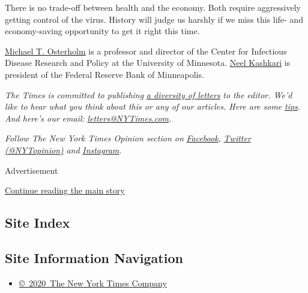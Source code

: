 There is no trade-off between health and the economy. Both require
aggressively getting control of the virus. History will judge us harshly
if we miss this life- and economy-saving opportunity to get it right
this time.

\href{https://www.cidrap.umn.edu/about-us/cidrap-staff/michael-t-osterholm-phd-mph}{Michael
T. Osterholm} is a professor and director of the Center for Infectious
Disease Research and Policy at the University of Minnesota.
\href{https://www.federalreservehistory.org/people/neel_kashkari}{Neel
Kashkari} is president of the Federal Reserve Bank of Minneapolis.

\emph{The Times is committed to publishing}
\href{https://www.nytimes3xbfgragh.onion/2019/01/31/opinion/letters/letters-to-editor-new-york-times-women.html}{\emph{a
diversity of letters}} \emph{to the editor. We'd like to hear what you
think about this or any of our articles. Here are some}
\href{https://help.nytimes3xbfgragh.onion/hc/en-us/articles/115014925288-How-to-submit-a-letter-to-the-editor}{\emph{tips}}\emph{.
And here's our email:}
\href{mailto:letters@NYTimes.com}{\emph{letters@NYTimes.com}}\emph{.}

\emph{Follow The New York Times Opinion section on}
\href{https://www.facebookcorewwwi.onion/nytopinion}{\emph{Facebook}}\emph{,}
\href{http://twitter.com/NYTOpinion}{\emph{Twitter (@NYTopinion)}}
\emph{and}
\href{https://www.instagram.com/nytopinion/}{\emph{Instagram}}\emph{.}

Advertisement

\protect\hyperlink{after-bottom}{Continue reading the main story}

\hypertarget{site-index}{%
\subsection{Site Index}\label{site-index}}

\hypertarget{site-information-navigation}{%
\subsection{Site Information
Navigation}\label{site-information-navigation}}

\begin{itemize}
\tightlist
\item
  \href{https://help.nytimes3xbfgragh.onion/hc/en-us/articles/115014792127-Copyright-notice}{©~2020~The
  New York Times Company}
\end{itemize}


